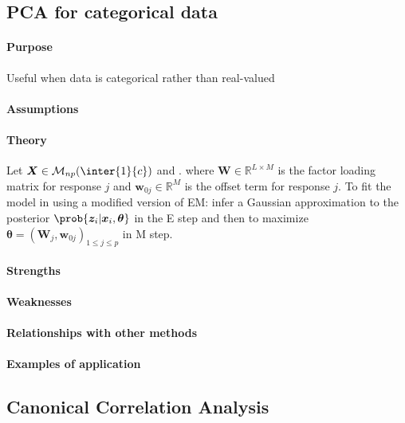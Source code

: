 \subsection{PCA for categorical data}
\paragraph{Purpose}
Useful when data is categorical rather than real-valued
\paragraph{Assumptions}
\paragraph{Theory}
Let $\bm{X}\in\mathcal{M}_{np}(\inter{1}{c})$ and .
where $\bm{W}\in\mathbb{R}^{L\times M}$ is the factor loading matrix for response $j$ 
and $\bm{w}_{0j}\in\mathbb{R}^{M}$ is the offset term for response $j$.
To fit the model in using a modified version of EM: infer a Gaussian approximation to 
the posterior $\prob{\bm{z}_{i}|\bm{x}_{i},\bm{\theta}}$ in the E step and then to 
maximize $\bm{\theta} = \left(\bm{W}_{j},\bm{w}_{0j}\right)_{1\leq j\leq p}$ in M step.

\paragraph{Strengths}
\paragraph{Weaknesses}
\paragraph{Relationships with other methods}
\paragraph{Examples of application}

\subsection{Canonical Correlation Analysis}
